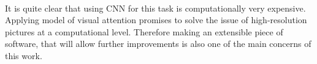 \paragraph{}
It is quite clear that using CNN for this task is computationally very expensive.
Applying model of visual attention promises to solve the issue of
high-resolution pictures at a computational level.
Therefore making an extensible piece of software, that will allow further
improvements is also one of the main concerns of this work.




